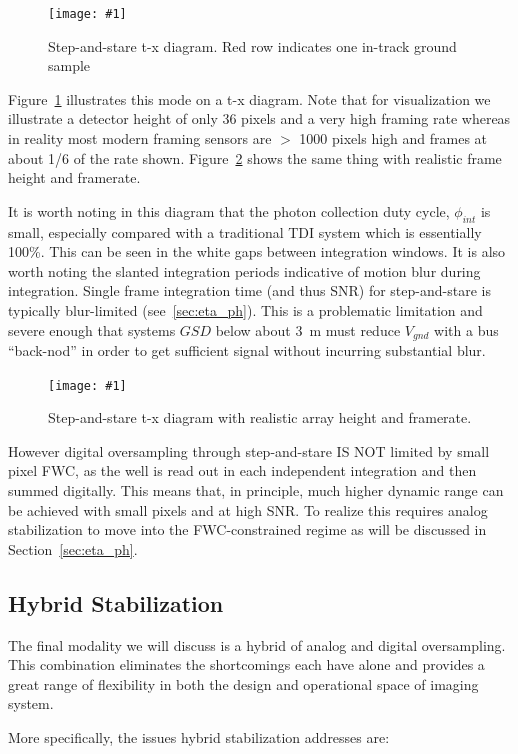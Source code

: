 \documentclass[]{spieman}  %
\newcommand{\includefigure}[3]
{
  \begin{figure}[h!tb]
  \centering
  \texttt{[image: \#1]}
  \caption[]{#3}
  \label{#2}
  \end{figure}
}
\begin{document}
\includefigure{figures/step_stare.pgf}{fig:step_stare}{Step-and-stare t-x diagram.  Red row indicates one in-track ground sample}

Figure~\ref{fig:step_stare} illustrates this mode on a t-x diagram.  Note that for visualization we illustrate a detector height of only 36 pixels and a very high framing rate whereas in reality most modern framing sensors are $>$ 1000 pixels high and frames at about 1/6 of the rate shown.  Figure~\ref{fig:step_stare_real} shows the same thing with realistic frame height and framerate.

It is worth noting in this diagram that the photon collection duty cycle, $\phi_{int}$ is small, especially compared with a traditional TDI system which is essentially 100\%.  This can be seen in the white gaps between integration windows.  It is also worth noting the slanted integration periods indicative of motion blur during integration.  Single frame integration time (and thus SNR) for step-and-stare is typically blur-limited (see~\ref{sec:eta_ph}).  This is a problematic limitation and severe enough that systems $GSD$ below about 3~m must reduce $V_{gnd}$ with a bus ``back-nod'' in order to get sufficient signal without incurring substantial blur.

\includefigure{figures/step_stare_real.pgf}{fig:step_stare_real}{Step-and-stare t-x diagram with realistic array height and framerate.}

However digital oversampling through step-and-stare IS NOT limited by small pixel FWC, as the well is read out in each independent integration and then summed digitally.  This means that, in principle, much higher dynamic range can be achieved with small pixels and at high SNR.  To realize this requires analog stabilization to move into the FWC-constrained regime as will be discussed in Section~\ref{sec:eta_ph}.

\subsection{Hybrid Stabilization}

The final modality we will discuss is a hybrid of analog and digital oversampling.  This combination eliminates the shortcomings each have alone and provides a great range of flexibility in both the design and operational space of imaging system.

More specifically, the issues hybrid stabilization addresses are:
\end{document}
